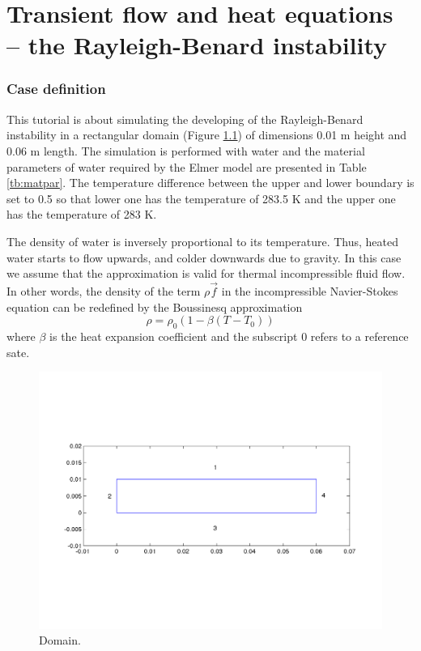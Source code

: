 \chapter{Transient flow and heat equations -- the Rayleigh-Benard instability}


\subsection*{Case definition}

This tutorial is about simulating the developing of the
Rayleigh-Benard instability in a rectangular domain  (Figure
\ref{fg:rb_geometry}) of dimensions 0.01 m height and 0.06 m
length. The simulation is performed with water and the material
parameters of water required by the Elmer model are presented in Table \ref{tb:matpar}. The
temperature difference between the upper and lower boundary is set to
0.5 so that lower one has the temperature of  283.5 K and the upper
one has the temperature of 283 K.


The density of water is inversely proportional to its
temperature. Thus, heated water starts to flow upwards, and colder
downwards due to gravity.  In this case we assume that the
 approximation is valid for thermal incompressible
fluid flow. In other words, the density of the term $\rho$$\vec{f}$ in
the incompressible Navier-Stokes equation can be redefined by the
Boussinesq approximation
\begin{displaymath}
\rho = {\rho}_0(1-\beta(T-{T}_0))
\end{displaymath}
where $\beta$ is the heat expansion coefficient and the subscript 0 refers to a reference sate.


\begin{figure}[h]
\centering
\includegraphics[width=150 mm, height=55 mm]{rb_geometry}
\caption{Domain.}\label{fg:rb_geometry}
\end{figure}  


